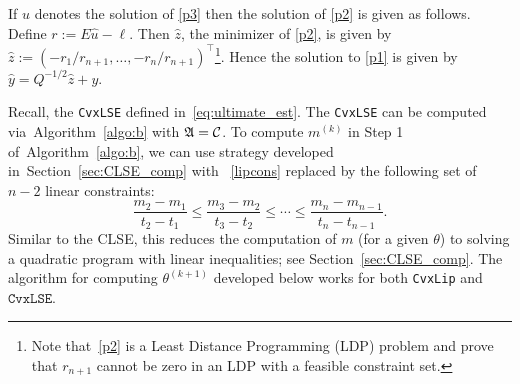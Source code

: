 If $\hat{u}$ denotes the solution of \eqref{p3}  then the solution of \eqref{p2} is given as follows. Define $r := E\hat{u} - \ell$. Then $\hat{z}$, the minimizer of \eqref{p2}, is given by $\hat{z} := (-r_1/r_{n+1},\ldots,  -r_n/r_{n+1})^\top$\footnote{Note that~\eqref{p2} is a Least Distance Programming (LDP) problem and \citet[page 167]{LAW} prove that $r_{n+1}$ cannot be zero in an LDP with a feasible constraint set.}. Hence the solution to \eqref{p1} is given by $\hat{y} = Q^{-1/2}\hat{z} + y$.

\begin{remark}\label{rem:CvxLSE} Recall, the \texttt{CvxLSE} defined in~\eqref{eq:ultimate_est}. The \texttt{CvxLSE} can be computed via~Algorithm~\ref{algo:b} with $\mathfrak{A} = \mathcal{C}$. To compute $m^{(k)}$ in Step 1 of~Algorithm~\ref{algo:b}, we can use strategy developed in~Section~\ref{sec:CLSE_comp} with ~\eqref{lipcons} replaced by
 the following set of $n-2$ linear constraints:
\begin{equation}
\frac{m_2 - m_1}{t_2 - t_1} \le \frac{m_3 - m_2}{t_3 - t_2} \le \cdots \le \frac{m_{n} - m_{n-1}}{t_n - t_{n-1}}.\label{convcons}
\end{equation}
 Similar to the CLSE, this reduces the computation of $m$ (for a given $\theta$) to solving a quadratic program with linear inequalities; see Section~\ref{sec:CLSE_comp}. The algorithm for computing $\theta^{(k+1)}$ developed below works for both \texttt{CvxLip} and $\texttt{CvxLSE}$.
\end{remark}
